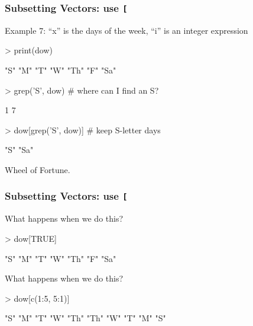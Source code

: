 \documentclass{beamer}
\newcommand{\R}[1]{\texttt{#1}}
\begin{document}
\begin{frame}[fragile]
\frametitle{Subsetting Vectors: use \R{[}}

Example 7: ``x'' is the days of the week, ``i'' is an integer expression
\pause
\begin{Schunk}
\begin{Sinput}
> print(dow)
\end{Sinput}
\begin{Soutput}
[1] "S"  "M"  "T"  "W"  "Th" "F"  "Sa"
\end{Soutput}
\end{Schunk}
\pause
\begin{Schunk}
\begin{Sinput}
> grep('S', dow) # where can I find an S?
\end{Sinput}
\begin{Soutput}
[1] 1 7
\end{Soutput}
\end{Schunk}
\pause
\begin{Schunk}
\begin{Sinput}
> dow[grep('S', dow)]  # keep S-letter days
\end{Sinput}
\end{Schunk}
\pause
\begin{Schunk}
\begin{Soutput}
[1] "S"  "Sa"
\end{Soutput}
\end{Schunk}
\pause
Wheel of Fortune. 

\end{frame}



\begin{frame}[fragile]
\frametitle{Subsetting Vectors: use \R{[}}

What happens when we do this?
\begin{Schunk}
\begin{Sinput}
> dow[TRUE]
\end{Sinput}
\end{Schunk}
\pause
\begin{Schunk}
\begin{Soutput}
[1] "S"  "M"  "T"  "W"  "Th" "F"  "Sa"
\end{Soutput}
\end{Schunk}
\pause
What happens when we do this?
\begin{Schunk}
\begin{Sinput}
> dow[c(1:5, 5:1)]  
\end{Sinput}
\end{Schunk}
\pause
\begin{Schunk}
\begin{Soutput}
 [1] "S"  "M"  "T"  "W"  "Th" "Th" "W"  "T"  "M"  "S" 
\end{Soutput}
\end{Schunk}

\end{frame}
\end{document}

